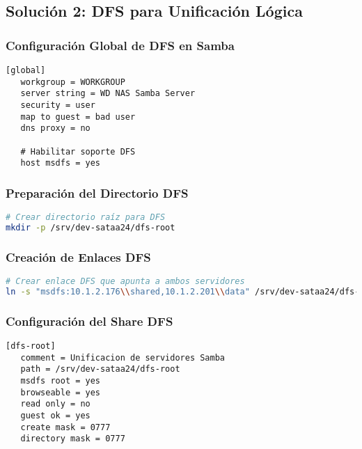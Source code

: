 \documentclass[12pt, a4paper]{article}
\begin{document}
\subsection{Solución 2: DFS para Unificación Lógica}
\label{subsec:solucion_dfs}

\subsubsection{Configuración Global de DFS en Samba}
\begin{lstlisting}[caption=Habilitar DFS en smb.conf]
[global]
   workgroup = WORKGROUP
   server string = WD NAS Samba Server
   security = user
   map to guest = bad user
   dns proxy = no
   
   # Habilitar soporte DFS
   host msdfs = yes
\end{lstlisting}

\subsubsection{Preparación del Directorio DFS}
\begin{lstlisting}[language=bash, caption=Preparar estructura DFS]
# Crear directorio raíz para DFS
mkdir -p /srv/dev-sataa24/dfs-root
\end{lstlisting}

\subsubsection{Creación de Enlaces DFS}
\begin{lstlisting}[language=bash, caption=Crear enlace DFS unificado]
# Crear enlace DFS que apunta a ambos servidores
ln -s "msdfs:10.1.2.176\\shared,10.1.2.201\\data" /srv/dev-sataa24/dfs-root/unificado
\end{lstlisting}

\subsubsection{Configuración del Share DFS}
\begin{lstlisting}[caption=Share DFS en smb.conf]
[dfs-root]
   comment = Unificacion de servidores Samba
   path = /srv/dev-sataa24/dfs-root
   msdfs root = yes
   browseable = yes
   read only = no
   guest ok = yes
   create mask = 0777
   directory mask = 0777
\end{lstlisting}
\end{document}
